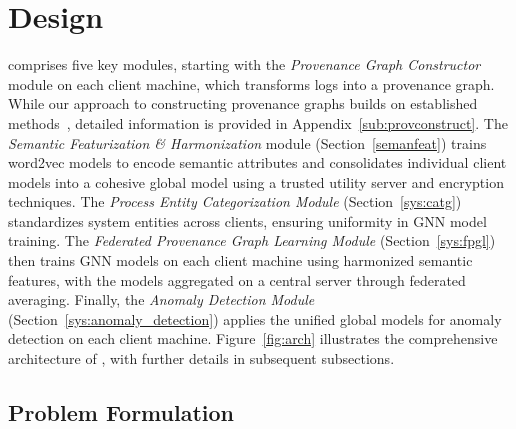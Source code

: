 \section{Design}
\label{sec:methodology}



\Sys comprises five key modules, starting with the \textit{Provenance Graph Constructor} module on each client machine, which transforms logs into a provenance graph. While our approach to constructing provenance graphs builds on established methods~\cite{inam2023sok,nodoze2019,mpi+ma,loggc,lpm2015,hossain2017sleuth}, detailed information is provided in Appendix~\ref{sub:provconstruct}. The \textit{Semantic Featurization \& Harmonization} module (Section~\ref{semanfeat}) trains word2vec models to encode semantic attributes and consolidates individual client models into a cohesive global model using a trusted utility server and encryption techniques. The \textit{Process Entity Categorization Module} (Section~\ref{sys:catg}) standardizes system entities across clients, ensuring uniformity in GNN model training. The \textit{Federated Provenance Graph Learning Module} (Section~\ref{sys:fpgl}) then trains GNN models on each client machine using harmonized semantic features, with the models aggregated on a central server through federated averaging. Finally, the \textit{Anomaly Detection Module} (Section~\ref{sys:anomaly_detection}) applies the unified global models for anomaly detection on each client machine. Figure~\ref{fig:arch} illustrates the comprehensive architecture of \Sys, with further details in subsequent subsections.

\subsection{Problem Formulation}

